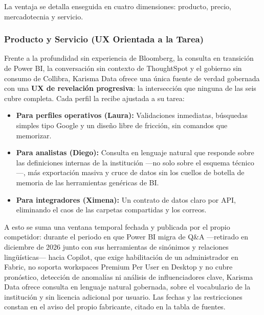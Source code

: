 La ventaja se detalla enseguida en cuatro dimensiones: producto, precio, mercadotecnia y servicio.

\subsubsection{Producto y Servicio (UX Orientada a la Tarea)}
Frente a la profundidad sin experiencia de Bloomberg, la consulta en transición de Power BI, la conversación sin contexto de ThoughtSpot y el gobierno sin consumo de Collibra, Karisma Data ofrece una única fuente de verdad gobernada con una \textbf{UX de revelación progresiva}: la intersección que ninguna de las seis cubre completa. Cada perfil la recibe ajustada a su tarea:
\begin{itemize}
    \item \textbf{Para perfiles operativos (Laura):} Validaciones inmediatas, búsquedas simples tipo Google y un diseño libre de fricción, sin comandos que memorizar.
    \item \textbf{Para analistas (Diego):} Consulta en lenguaje natural que responde sobre las definiciones internas de la institución —no solo sobre el esquema técnico—, más exportación masiva y cruce de datos sin los cuellos de botella de memoria de las herramientas genéricas de BI.
    \item \textbf{Para integradores (Ximena):} Un contrato de datos claro por API, eliminando el caos de las carpetas compartidas y los correos.
\end{itemize}

A esto se suma una ventana temporal fechada y publicada por el propio competidor: durante el periodo en que Power BI migra de Q\&A —retirado en diciembre de 2026 junto con sus herramientas de sinónimos y relaciones lingüísticas— hacia Copilot, que exige habilitación de un administrador en Fabric, no soporta workspaces Premium Per User en Desktop y no cubre pronóstico, detección de anomalías ni análisis de influenciadores clave, Karisma Data ofrece consulta en lenguaje natural gobernada, sobre el vocabulario de la institución y sin licencia adicional por usuario. Las fechas y las restricciones constan en el aviso del propio fabricante, citado en la tabla de fuentes.

